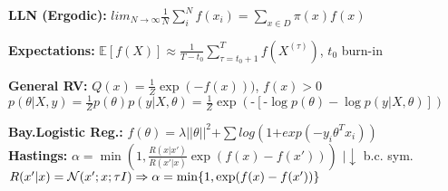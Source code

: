 \textbf{LLN (Ergodic):} $lim_{N\rightarrow \infty} \frac{1}{N} \sum_i^N f(x_i) = \sum_{x \in D} \pi(x)f(x)$\\
\begin{comment}
By design of the Markov Chain, the samples depend on each other, so the law of large numbers and the complexity bounds do not apply.\\
	Special case is when the Markov chain is Ergodic and the state space D is finite with stationary $\pi$.
	This is also called the law of large numbers for Markov Chains.\\
	This talks about if it converges to the correct thing, but unfortunately not how fast it converges.\\
\end{comment}

\textbf{Expectations:} $\mathbb{E}[f(X)] \approx \frac{1}{T-t_0} \sum_{\tau=t_0 +1}^T f(X^{(\tau)})$, $t_0$ burn-in\\
\begin{comment}
	The initial state is very crucial when it comes to time-to-convergence. Often the mode is determined heuristically, then started from there.\\
	Establishing convergence rates is very difficult in general.\\
\end{comment}

\textbf{General RV:} $Q(x) = \frac{1}{Z}\exp(-f(x)))$, $f(x) > 0$\\
$p(\theta| X,y) = \frac{1}{Z} p(\theta) p(y| X, \theta) = \frac{1}{Z} \exp(\text{-} [\text{-}\log p(\theta) - \log p(y|X,\theta)])$

\textbf{Bay.Logistic Reg.:} $f(\theta) = \lambda||\theta||^2 \text{+} \sum log(1 \text{+} exp(- y_i \theta^T x_i))$\\

\textbf{Hastings:} $\alpha = \min (1, \frac{R(x|x')}{R(x'|x)}\exp(f(x) - f(x')))$ $| \downarrow$ b.c. sym.\\
$R(x'|x) = \mathcal{N}(x';x;\tau I) \Rightarrow \alpha = \min \{ 1, \exp(f(x) - f(x')) \}$\\
\begin{comment}
	The R-fraction is 1, since Gaussians are symmetric.\\
	$f(x') < f(x)$: we accept with probability 1 if the cost function is smaller at x'.\\
	$f(x') > f(x)$: cost of new position is higher, still there is a possibility to go into this direction if not too high.\\
	\textbf{Note:} The Algo could get stuck.\\
\end{comment}

